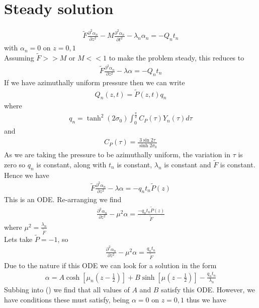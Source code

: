 \documentclass[12pt]{article}
\begin{document}
\section{Steady solution}
\begin{align}
\tilde{F}\frac{\partial^2\alpha_n}{\partial z^2}-M\frac{\partial^2 \alpha_n}{\partial t^2}-\lambda_n\alpha_n=-Q_nt_n
\end{align}
with $\alpha_n=0$ on $z=0,1$
\\ Assuming $\tilde{F}>>M$ or $M<<1$ to make the problem steady, this reduces to 
\begin{align}
\tilde{F}\frac{\partial^2\alpha_n}{\partial z^2}-\lambda\alpha=-Q_nt_n
\end{align}
If we have azimuthally uniform pressure then we can write 
\begin{align}
Q_n(z,t)=\tilde{P}(z,t)q_n
\end{align}
where 
\begin{align}
q_n=\tanh^2(2\sigma_0)\int_0^{\frac{\pi}{2}}C_P(\tau)Y_n(\tau)d\tau
\end{align}
and 
\begin{align}
C_P(\tau)=\frac{3\sin 2\tau}{\sinh 2\sigma_0}
\end{align}
As we are taking the pressure to be azimuthally uniform, the variation in $\tau$ is zero so $q_n$ is constant, along with $t_n$ is constant, $\lambda_n$ is constant and $\tilde{F}$ is constant. Hence we have 
\begin{align}
\tilde{F}\frac{\partial^2\alpha_n}{\partial z^2}-\lambda\alpha=-q_nt_n\tilde{P}(z)
\end{align}
This is an ODE. Re-arranging we find 
\begin{align}
\frac{\partial^2\alpha_n}{\partial z^2}-\mu^2\alpha=\frac{-q_nt_n\tilde{P}(z)}{\tilde{F}}
\end{align}
where $\mu^2=\frac{\lambda_n}{\tilde{F}}$
\\ Lets take $\tilde{P}=-1$, so
\begin{align}
\frac{\partial^2\alpha_n}{\partial z^2}-\mu^2\alpha=\frac{q_nt_n}{\tilde{F}}
\end{align}
Due to the nature if this ODE we can look for a solution in the form 
\begin{align*}
\alpha=A\cosh[\mu_n(z-\frac{1}{2})]+B\sinh[\mu(z-\frac{1}{2})]-\frac{q_nt_n}{\lambda_n}
\end{align*}
Subbing into () we find that all values of $A$ and $B$ satisfy this ODE. However, we have conditions these must satisfy, being $\alpha=0$ on $z=0,1$ thus we have 
\end{document}
